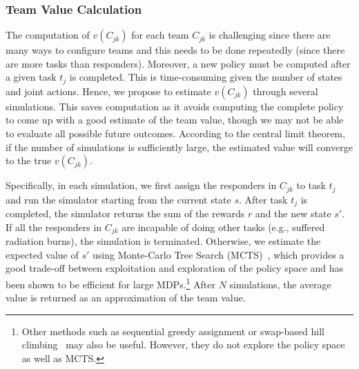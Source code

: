 \subsubsection{Team Value Calculation}
The computation of  $v(C_{jk})$ for each team $C_{jk}$ is
challenging since there are many ways to configure teams and this needs to be done repeatedly (since there are more tasks than responders).
Moreover, a new policy must be computed after a given task $t_j$ is completed. This is time-consuming given the number of
states and joint actions. Hence, we propose to estimate
$v(C_{jk})$ through several simulations. This saves
computation as it avoids computing the complete policy to come
up with a good estimate of the team value, though we may not be
able to evaluate all possible future outcomes. According to the
central limit theorem, if the number of simulations is sufficiently
large, the estimated value will converge to the true $v(C_{jk})$.

Specifically, in each simulation, we first assign the responders in
$C_{jk}$ to task $t_j$ and run the simulator starting from the
current state $s$. After task $t_j$ is completed, the simulator
returns the sum of the rewards $r$ and the new state $s'$. If all
the responders in $C_{jk}$ are incapable of doing other tasks
(e.g., suffered radiation burns), the simulation is terminated.
Otherwise, we estimate the expected value of $s'$ using Monte-Carlo
Tree Search (MCTS)~\cite{kocsis2006bandit}, which provides a good
trade-off between exploitation and exploration of the policy space
and has been shown to be efficient for large MDPs.\footnote{Other
methods such as sequential greedy assignment or swap-based hill
climbing~\cite{proper2009solving} may also be useful. However, they
do not explore the policy space as well as MCTS.} After $N$
simulations, the average value is returned as an approximation of
the team value.

